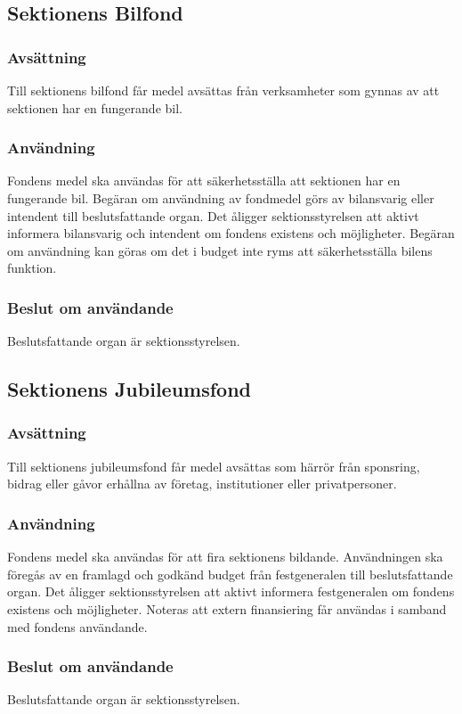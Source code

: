 \documentclass{datateknologsektionen-document}
\begin{document}
\subsection{Sektionens Bilfond}
\subsubsection{Avsättning}
Till sektionens bilfond får medel avsättas från verksamheter som gynnas av att sektionen har en
fungerande bil.
\subsubsection{Användning}
Fondens medel ska användas för att säkerhetsställa att sektionen har en fungerande bil. Begäran om användning av fondmedel görs av bilansvarig eller intendent till beslutsfattande organ. Det åligger sektionsstyrelsen att aktivt informera bilansvarig och intendent om fondens existens och möjligheter. Begäran om användning kan göras om det i budget inte ryms att säkerhetsställa bilens funktion.
\subsubsection{Beslut om användande}
Beslutsfattande organ är sektionsstyrelsen.

\subsection{Sektionens Jubileumsfond}
\subsubsection{Avsättning}
Till sektionens jubileumsfond får medel avsättas som härrör från sponsring, bidrag eller gåvor erhållna av företag, institutioner eller privatpersoner.
\subsubsection{Användning}
Fondens medel ska användas för att fira sektionens bildande. Användningen ska föregås av en framlagd och godkänd budget från festgeneralen till beslutsfattande organ. Det åligger sektionsstyrelsen att aktivt informera festgeneralen om fondens existens och möjligheter. Noteras att extern finansiering får användas i samband med fondens användande.
\subsubsection{Beslut om användande}
Beslutsfattande organ är sektionsstyrelsen.
\end{document}
